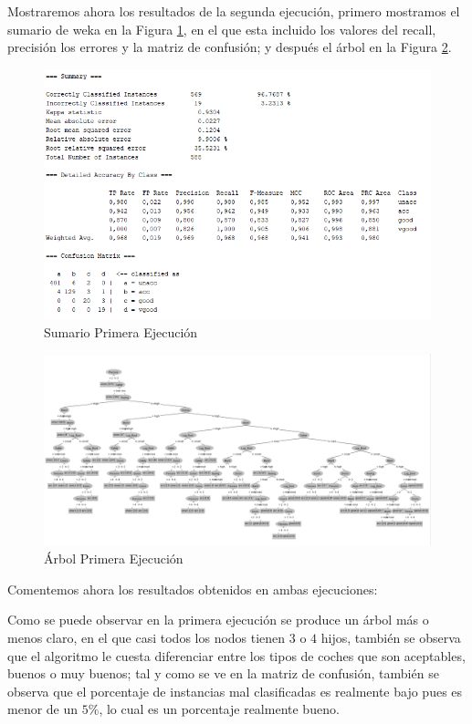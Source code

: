 \documentclass[a4paper, 11pt, twoside, openany, onecolumn, final]{memoir}
\begin{document}
	Mostraremos ahora los resultados de la segunda ejecución, primero mostramos el sumario de weka en la Figura \ref{SumarioSegundaEjecucion}, en el que esta incluido los valores del recall, precisión los errores y la matriz de confusión; y después el árbol en la Figura \ref{ArbolSegundaEjecucion}.
	\begin{figure}
  		\centering
   		\includegraphics{Imagenes/SummaryConEntreYValYBinarySplit}
  		\caption{Sumario Primera Ejecución}
  		\label{SumarioSegundaEjecucion}
	\end{figure}	
	
	\begin{figure}
  		\centering
   		\includegraphics[width=1\textwidth]{Imagenes/ArbolConEntreYValYBinarySplit}
  		\caption{Árbol Primera Ejecución}
  		\label{ArbolSegundaEjecucion}
	\end{figure}
	
	Comentemos ahora los resultados obtenidos en ambas ejecuciones:
	
	Como se puede observar en la primera ejecución se produce un árbol más o menos claro, en el que casi todos los nodos tienen $3$ o $4$ hijos, también se observa que el algoritmo le cuesta diferenciar entre los tipos de coches que son aceptables, buenos o muy buenos; tal y como se ve en la matriz de confusión, también se observa que el porcentaje de instancias mal clasificadas es realmente bajo pues es menor de un $5\%$, lo cual es un porcentaje realmente bueno.
	
\end{document}
